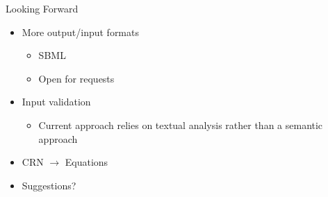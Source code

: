 \begin{frame}{Looking Forward}
\begin{itemize}
	\item More output/input formats
		\begin{itemize}
			\item SBML
			\item Open for requests
		\end{itemize}
	\item Input validation
		\begin{itemize}
			\item Current approach relies on textual analysis rather than a semantic approach
		\end{itemize}
	\item CRN $\rightarrow$ Equations
	\item Suggestions?

\end{itemize}
\end{frame}